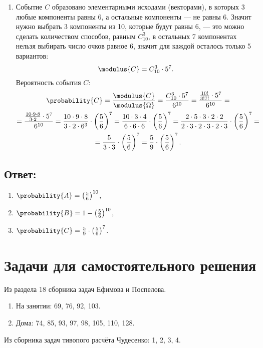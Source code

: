 \begin{enumerate}
    \item
    Событие $C$ образовано элементарными исходами (векторами), в которых 3 любые компоненты равны 6, а остальные компоненты ---
    не равны 6. Значит нужно выбрать 3 компоненты из 10, которые будут равны 6, --- это можно сделать количеством способов, равным $C_{10}^3$,
    в остальных 7 компонентах нельзя выбирать число очков равное 6, значит для каждой осталось только 5 вариантов:
    \begin{equation}
        \modulus{C} = C_{10}^3 \cdot 5^7 .
    \end{equation}
    Вероятность события $C$:
    \begin{multline}
        \probability{C}
        = \frac{\modulus{C}}{\modulus{\Omega}}
        = \frac{C_{10}^3 \cdot 5^7}{6^{10}}
        = \frac{\frac{10!}{3!7!} \cdot 5^7}{6^{10}} = \\
        = \frac{\frac{10 \cdot 9 \cdot 8}{3 \cdot 2}  \cdot 5^7}{6^{10}}
        = \frac{10 \cdot 9 \cdot 8}{3 \cdot 2 \cdot 6^3} \cdot \left ( \frac{5}{6} \right )^7
        = \frac{10 \cdot 3 \cdot 4}{6 \cdot 6 \cdot 6} \cdot \left ( \frac{5}{6} \right )^7
        = \frac{2 \cdot 5 \cdot 3 \cdot 2 \cdot 2}{2 \cdot 3 \cdot 2 \cdot 3 \cdot 2 \cdot 3} \cdot \left ( \frac{5}{6} \right )^7 = \\
        = \frac{5}{3 \cdot 3} \cdot \left ( \frac{5}{6} \right )^7
        = \frac{5}{9} \cdot \left ( \frac{5}{6} \right )^7 .
    \end{multline}
\end{enumerate}

\subsection*{Ответ:}
\begin{enumerate}
    \item $\probability{A} = \left ( \frac{5}{6} \right )^{10}$,
    \item $\probability{B} = 1 - \left ( \frac{5}{6} \right )^{10}$,
    \item $\probability{C} = \frac{5}{9} \cdot \left ( \frac{5}{6} \right )^7$.
\end{enumerate}

\section*{Задачи для самостоятельного решения}

Из раздела 18 сборника задач Ефимова и Поспелова.
\begin{enumerate}
    \item На занятии: 69, 76, 92, 103.
    \item Дома: 74, 85, 93, 97, 98, 105, 110, 128.
\end{enumerate}

Из сборника задач тивопого расчёта Чудесенко: 1, 2, 3, 4.